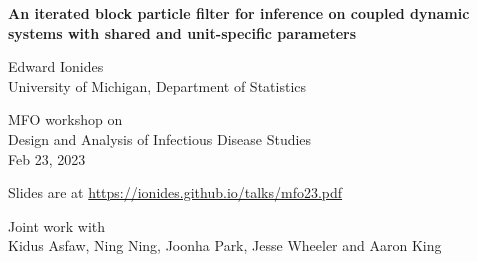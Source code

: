 \documentclass{beamer}
\begin{document}
\begin{frame}
  
\begin{center}
  {\Large\bf An iterated block particle filter for inference on coupled dynamic systems with shared and unit-specific parameters}


\vspace{2mm}

Edward Ionides\\
University of Michigan, Department of Statistics

\vspace{8mm}

MFO workshop on \\
Design and Analysis of Infectious Disease Studies
\\
Feb 23, 2023


\hspace{3mm}

Slides are at \url{https://ionides.github.io/talks/mfo23.pdf}

\vspace{8mm}

Joint work with\\
Kidus Asfaw, Ning Ning, Joonha Park, Jesse Wheeler and Aaron King

\end{center}

\end{frame}
\end{document}
